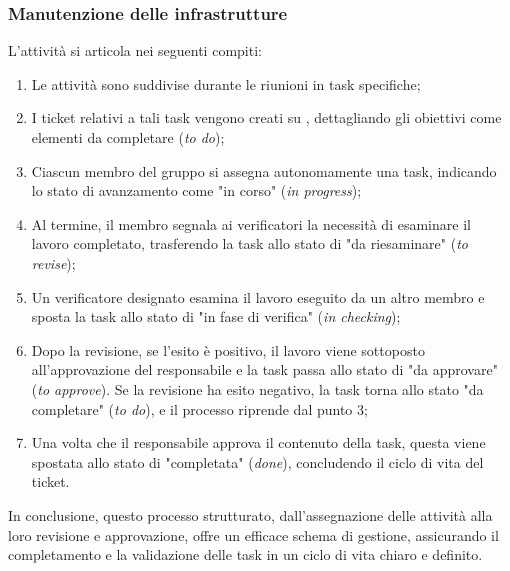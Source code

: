 \subsubsection{Manutenzione delle infrastrutture}
L'attività si articola nei seguenti compiti:
            \begin{enumerate}
                
            \item Le attività sono suddivise durante le riunioni in task specifiche;
            \item I ticket relativi a tali task vengono creati su , dettagliando gli obiettivi come elementi da completare (\textit{to do});
            \item Ciascun membro del gruppo si assegna autonomamente una task, indicando lo stato di avanzamento come "in corso" (\textit{in progress});
            \item Al termine, il membro segnala ai verificatori la necessità di esaminare il lavoro completato, trasferendo la task allo stato di "da riesaminare" (\textit{to revise});
            \item Un verificatore designato esamina il lavoro eseguito da un altro membro e sposta la task allo stato di "in fase di verifica" (\textit{in checking});
            \item Dopo la revisione, se l'esito è positivo, il lavoro viene sottoposto all'approvazione del responsabile e la task passa allo stato di "da approvare" (\textit{to approve}). Se la revisione ha esito negativo, la task torna allo stato "da completare" (\textit{to do}), e il processo riprende dal punto 3;
            \item Una volta che il responsabile approva il contenuto della task, questa viene spostata allo stato di "completata" (\textit{done}), concludendo il ciclo di vita del ticket.
            \end{enumerate}
In conclusione, questo processo strutturato, dall'assegnazione delle attività alla loro revisione e approvazione, offre un efficace schema di gestione, assicurando il completamento e la validazione delle task in un ciclo di vita chiaro e definito.

